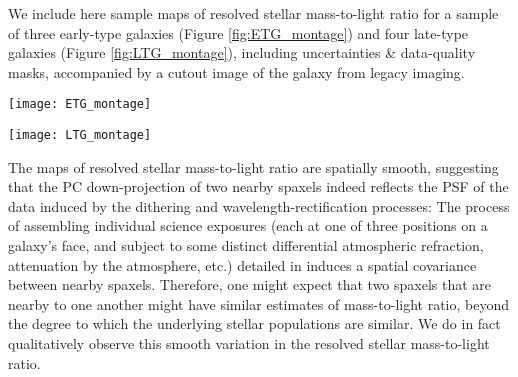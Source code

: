 We include here sample maps of resolved stellar mass-to-light ratio for a sample of three early-type galaxies (Figure \ref{fig:ETG_montage}) and four late-type galaxies (Figure \ref{fig:LTG_montage}), including uncertainties \& data-quality masks, accompanied by a cutout image of the galaxy from legacy imaging.
%
\begin{figure*}
    \centering
    \texttt{[image: ETG\_montage]}
    \caption[Maps of $i$-band stellar mass-to-light ratio for three early-type galaxies]{\fixspacing A selection of three early-type galaxies: In the left-hand column, the SDSS cutout with a purple hexagon denoting the approximate spatial grasp of the IFU. In the middle column, an image of the resolved estimate of $i$-band stellar mass-to-light ratio, taken as the 50$^{\rm th}$ percentile of the posterior PDF for a given spaxel. In the right-hand panel, a map of the adopted uncertainty in stellar mass-to-light ratio, taken as half the difference between the 16$^{\rm th}$ and 84$^{\rm th}$ percentiles of the posterior PDF. Spaxels with hatching top-left to bottom-right have poorly-sampled PDFs, and spaxels with hatching top-right to bottom-left have no data. Spaxels filled with dots had a numerical failure in the PC down-projection, which prevented an estimate from being made (very rare).}
    \label{fig:ETG_montage}
\end{figure*}
%
\begin{figure*}
    \centering
    \texttt{[image: LTG\_montage]}
    \caption[As Figure \ref{fig:ETG_montage}, but a selection of four late-type galaxies]{\fixspacing As Figure \ref{fig:ETG_montage}, but a selection of four late-type galaxies. 8114-3704 is seen edge-on \& exhibits a dust lane, 8990-9102 is star-forming and is seen nearly face-on, 9497-12701 is moderately-inclined and has a low SFR, and 8149-9101 is a low-mass dwarf galaxy with ongoing star-formation.}
    \label{fig:LTG_montage}
\end{figure*}
%
The maps of resolved stellar mass-to-light ratio are spatially smooth, suggesting that the PC down-projection of two nearby spaxels indeed reflects the PSF of the data induced by the dithering and wavelength-rectification processes: The process of assembling individual science exposures (each at one of three positions on a galaxy's face, and subject to some distinct differential atmospheric refraction, attenuation by the atmosphere, etc.) detailed in \citet[][Section 9.2]{manga_drp} induces a spatial covariance between nearby spaxels. Therefore, one might expect that two spaxels that are nearby to one another might have similar estimates of mass-to-light ratio, beyond the degree to which the underlying stellar populations are similar. We do in fact qualitatively observe this smooth variation in the resolved stellar mass-to-light ratio.

